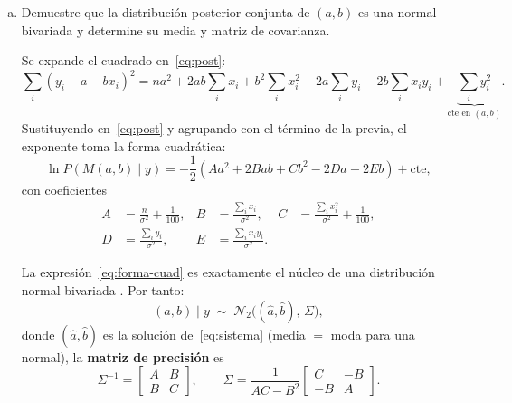 \documentclass[a4paper]{article}
\begin{document}
\begin{enumerate}[a)]
\begin{lstlisting}
a_map, b_map = np.linalg.solve(M_mat, Z_vec)   # resuelve M theta = Z
\end{lstlisting}

La solución numérica obtenida para los estimadores MAP fue:
\begin{equation}
  \boxed{\hat a = 7.2506, \qquad \hat b = 3.1462.}
  \label{eq:map-numerico}
\end{equation}
Es decir, el modelo ajustado con los valores de máxima probabilidad a posteriori queda
\begin{equation}
  \widehat{M}_{\text{MAP}} = 7.2506 + 3.1462\,\log_{10}(P).
\end{equation}

    \item Demuestre que la distribución posterior conjunta de $(a, b)$ es una normal bivariada y determine su media y matriz de covarianza.
    
    Se expande el cuadrado en~\eqref{eq:post}:
\[
  \sum_i(y_i-a-bx_i)^2
  = na^2 + 2ab\!\sum_i x_i + b^2\!\sum_i x_i^2
    - 2a\!\sum_i y_i - 2b\!\sum_i x_iy_i
    + \underbrace{\sum_i y_i^2}_{\text{cte en }(a,b)}.
\]
Sustituyendo en~\eqref{eq:post} y agrupando con el término de la previa,
el exponente toma la forma cuadrática:
\begin{equation}
  \ln P(M(a,b)\mid y)
  = -\frac{1}{2}\!\left(Aa^2 + 2Bab + Cb^2 - 2Da - 2Eb\right)
    + \mathrm{cte},
  \label{eq:forma-cuad}
\end{equation}
con coeficientes
\begin{align}
  A &= \frac{n}{\sigma^2}+\frac{1}{100}, &
  B &= \frac{\sum_i x_i}{\sigma^2}, &
  C &= \frac{\sum_i x_i^2}{\sigma^2}+\frac{1}{100},
  \label{eq:ABC}\\
  D &= \frac{\sum_i y_i}{\sigma^2}, &
  E &= \frac{\sum_i x_iy_i}{\sigma^2}.&&
  \label{eq:DE}
\end{align}

La expresión~\eqref{eq:forma-cuad} es exactamente el núcleo de una
distribución normal bivariada \cite{devore2008}.  
Por tanto:
\begin{equation}
  (a,b)\mid y \;\sim\; \mathcal{N}_2\!\bigl((\hat{a},\hat{b}),\,\Sigma\bigr),
  \label{eq:posterior-normal}
\end{equation}
donde $(\hat{a},\hat{b})$ es la solución de~\eqref{eq:sistema} (media
$=$ moda para una normal), la \textbf{matriz de precisión} es
\begin{equation}
  \Sigma^{-1}
  = \begin{bmatrix}A & B \\ B & C\end{bmatrix},
  \qquad
  \Sigma
  = \frac{1}{AC-B^2}\begin{bmatrix}C&-B\\-B&A\end{bmatrix}.
  \label{eq:cov}
\end{equation}


\end{enumerate}
\end{document}

